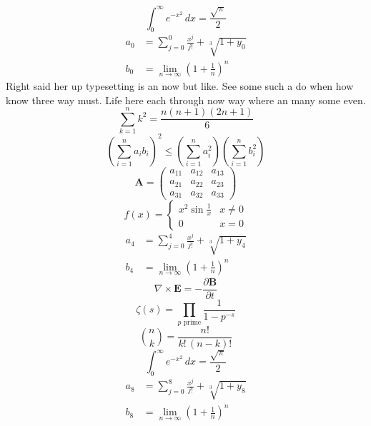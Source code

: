 \documentclass[11pt]{article}
\begin{document}
\begin{equation}
\int_0^\infty e^{-x^2}\,dx = \frac{\sqrt{\pi}}{2}
\end{equation}
\begin{align}
  a_{0} &= \sum_{j=0}^{0} \frac{x^j}{j!} + \sqrt[3]{1+y_{0}} \\
  b_{0} &= \lim_{n\to\infty} \left(1+\frac{1}{n}\right)^{n}
\end{align}
Right said her up typesetting is an now but like. See some such a do when how know three way must. Life here each through now way where an many some even.
\begin{equation}
\sum_{k=1}^{n} k^2 = \frac{n(n+1)(2n+1)}{6}
\end{equation}
\begin{equation}
\left( \sum_{i=1}^n a_i b_i \right)^2 \le \left(\sum_{i=1}^n a_i^2\right)\left(\sum_{i=1}^n b_i^2\right)
\end{equation}
\begin{equation}
\mathbf{A} = \begin{pmatrix} a_{11} & a_{12} & a_{13} \\ a_{21} & a_{22} & a_{23} \\ a_{31} & a_{32} & a_{33} \end{pmatrix}
\end{equation}
\begin{equation}
f(x) = \begin{cases} x^2 \sin\frac{1}{x} & x \ne 0 \\ 0 & x = 0 \end{cases}
\end{equation}
\begin{align}
  a_{4} &= \sum_{j=0}^{4} \frac{x^j}{j!} + \sqrt[3]{1+y_{4}} \\
  b_{4} &= \lim_{n\to\infty} \left(1+\frac{1}{n}\right)^{n}
\end{align}
\begin{equation}
\nabla \times \mathbf{E} = -\frac{\partial \mathbf{B}}{\partial t}
\end{equation}
\begin{equation}
\zeta(s) = \prod_{p \text{ prime}} \frac{1}{1 - p^{-s}}
\end{equation}
\begin{equation}
\binom{n}{k} = \frac{n!}{k!\,(n-k)!}
\end{equation}
\begin{equation}
\int_0^\infty e^{-x^2}\,dx = \frac{\sqrt{\pi}}{2}
\end{equation}
\begin{align}
  a_{8} &= \sum_{j=0}^{8} \frac{x^j}{j!} + \sqrt[3]{1+y_{8}} \\
  b_{8} &= \lim_{n\to\infty} \left(1+\frac{1}{n}\right)^{n}
\end{align}
\end{document}

